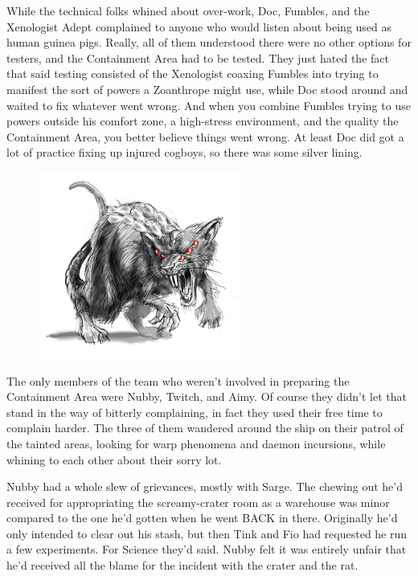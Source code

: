 While the technical folks whined about over-work, Doc, Fumbles, and the Xenologist Adept complained to anyone who would listen about being used as human guinea pigs. 
Really, all of them understood there were no other options for testers, and the Containment Area had to be tested. 
They just hated the fact that said testing consisted of the Xenologist coaxing Fumbles into trying to manifest the sort of powers a Zoanthrope might use, while Doc stood around and waited to fix whatever went wrong. 
And when you combine Fumbles trying to use powers outside his comfort zone, a high-stress environment, and the quality the Containment Area, you better believe things went wrong. 
At least Doc did got a lot of practice fixing up injured cogboys, so there was some silver lining.
\begin{figure}
	\begin{center}
		\includegraphics[width=\figwidth]{pics/12/9.png}
	\end{center}
\end{figure}
The only members of the team who weren't involved in preparing the Containment Area were Nubby, Twitch, and Aimy. 
Of course they didn't let that stand in the way of bitterly complaining, in fact they used their free time to complain harder. 
The three of them wandered around the ship on their patrol of the tainted areas, looking for warp phenomena and daemon incursions, while whining to each other about their sorry lot.

Nubby had a whole slew of grievances, mostly with Sarge. 
The chewing out he'd received for appropriating the screamy-crater room as a warehouse was minor compared to the one he'd gotten when he went BACK in there. 
Originally he'd only intended to clear out his stash, but then Tink and Fio had requested he run a few experiments. 
For Science they'd said. 
Nubby felt it was entirely unfair that he'd received all the blame for the incident with the crater and the rat. 


